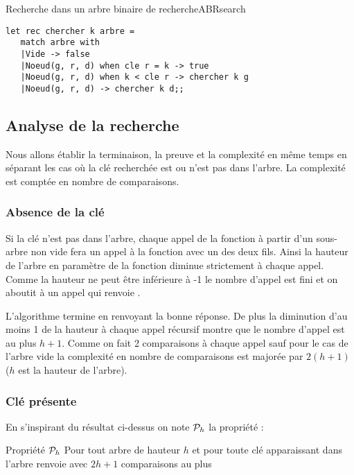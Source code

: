 \begin{code}{Recherche dans un arbre binaire de recherche}{ABRsearch}
\begin{lstlisting}
let rec chercher k arbre = 
   match arbre with
   |Vide -> false
   |Noeud(g, r, d) when cle r = k -> true
   |Noeud(g, r, d) when k < cle r -> chercher k g
   |Noeud(g, r, d) -> chercher k d;;
\end{lstlisting}
\end{code}
\subsection{Analyse de la recherche}
Nous allons établir la terminaison, la preuve et la complexité en même temps en séparant les cas où la clé recherchée est ou n'est pas dans l'arbre.  La complexité est comptée en nombre de comparaisons.

\subsubsection{Absence de la clé}
 Si la clé n'est pas dans l'arbre, chaque appel de la fonction à partir d'un sous-arbre non vide fera un appel à la fonction avec un des deux fils. Ainsi la hauteur de l'arbre en paramètre de la fonction diminue strictement à chaque appel. Comme la hauteur ne peut être inférieure à -1 le nombre d'appel est fini et on aboutit à un appel  qui renvoie .
 
L'algorithme termine en renvoyant la bonne réponse. De plus la diminution  d'au moins 1 de la hauteur à chaque appel récursif montre que le nombre d'appel est au plus $h+1$. Comme on fait 2 comparaisons à chaque appel sauf pour le cas de l'arbre vide la complexité en nombre de comparaisons est majorée par $2(h+1)$ ($h$ est la hauteur de l'arbre).

\subsubsection{Clé présente}
 En s'inspirant du résultat ci-dessus on note ${\cal P}_h$ la propriété :

\begin{defin}{Propriété ${\cal P}_h$}{}
Pour tout arbre  de hauteur $h$ et pour toute clé  apparaissant dans l'arbre 
 renvoie  avec $2h+1$ comparaisons au plus
\end{defin}

